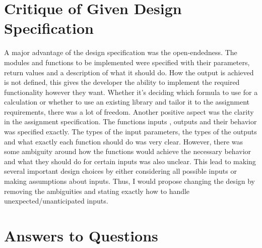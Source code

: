 \documentclass[12pt]{article}
\begin{document}
\section{Critique of Given Design Specification}

A major advantage of the design specification was the open-endedness. The modules and functions to be implemented were specified with their parameters, return values and a description of what it should do. How the output is achieved is not defined, this gives the developer the ability to implement the required functionality however they want. Whether it's deciding which formula to use for a calculation or whether to use an existing library and tailor it to the assignment requirements, there was a lot of freedom. Another positive aspect was the clarity in the assignment specification. The functions inputs , outputs and their behavior was specified exactly. The types of the input parameters, the types of the outputs and what exactly each function should do was very clear. However, there was some ambiguity around how the functions would achieve the necessary behavior and what they should do for certain inputs was also unclear. This lead to making several important design choices by either considering all possible inputs or making assumptions about inputs. Thus, I would propose changing the design by removing the ambiguities and stating exactly how to handle unexpected/unanticipated inputs.


\section{Answers to Questions}
\end{document}
